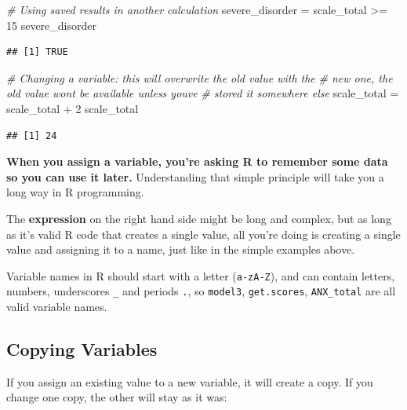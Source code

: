 \documentclass[
]{book}
\newenvironment{Shaded}{\begin{snugshade}}{\end{snugshade}}
\newcommand{\CommentTok}[1]{\textcolor[rgb]{0.56,0.35,0.01}{\textit{#1}}}
\newcommand{\DecValTok}[1]{\textcolor[rgb]{0.00,0.00,0.81}{#1}}
\newcommand{\NormalTok}[1]{#1}
\newcommand{\OtherTok}[1]{\textcolor[rgb]{0.56,0.35,0.01}{#1}}
\newcommand{\SpecialCharTok}[1]{\textcolor[rgb]{0.00,0.00,0.00}{#1}}
\begin{document}
\begin{Shaded}
\begin{Highlighting}[]
\CommentTok{\# Using saved results in another calculation}
\NormalTok{severe\_disorder }\OtherTok{=}\NormalTok{ scale\_total }\SpecialCharTok{\textgreater{}=} \DecValTok{15}
\NormalTok{severe\_disorder}
\end{Highlighting}
\end{Shaded}

\begin{verbatim}
## [1] TRUE
\end{verbatim}

\begin{Shaded}
\begin{Highlighting}[]
\CommentTok{\# Changing a variable: this will overwrite the old value with the}
\CommentTok{\#   new one, the old value won\textquotesingle{}t be available unless you\textquotesingle{}ve}
\CommentTok{\#   stored it somewhere else}
\NormalTok{scale\_total }\OtherTok{=}\NormalTok{ scale\_total }\SpecialCharTok{+} \DecValTok{2}
\NormalTok{scale\_total}
\end{Highlighting}
\end{Shaded}

\begin{verbatim}
## [1] 24
\end{verbatim}

\textbf{When you assign a variable, you're asking R to remember some data so you can
use it later.} Understanding that simple
principle will take you a long way in R programming.

The \textbf{expression} on the right hand side might be long and complex,
but as long as it's valid R code that creates a single value,
all you're doing is creating a single value and assigning it to
a name, just like in the simple examples above.

Variable names in R should start with a letter (\texttt{a-zA-Z}), and
can contain letters, numbers, underscores \texttt{\_} and periods \texttt{.}, so
\texttt{model3}, \texttt{get.scores}, \texttt{ANX\_total} are all valid variable names.

\hypertarget{copying-variables}{%
\subsection{Copying Variables}\label{copying-variables}}

If you assign an existing value to a new variable, it will
create a copy. If you change one copy, the other will
stay as it was:
\end{document}
